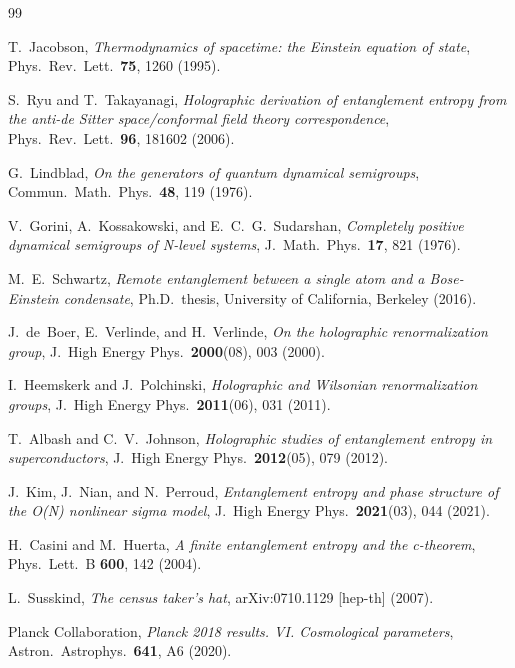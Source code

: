 \documentclass[12pt,a4paper]{article}
\theoremstyle{monette}
\theoremstyle{definition}
\begin{document}
\begin{thebibliography}{99}

T.~Jacobson,
\textit{Thermodynamics of spacetime: the Einstein equation of state},
Phys.\ Rev.\ Lett.\ \textbf{75}, 1260 (1995).

S.~Ryu and T.~Takayanagi,
\textit{Holographic derivation of entanglement entropy from the anti-de Sitter
space/conformal field theory correspondence},
Phys.\ Rev.\ Lett.\ \textbf{96}, 181602 (2006).

G.~Lindblad,
\textit{On the generators of quantum dynamical semigroups},
Commun.\ Math.\ Phys.\ \textbf{48}, 119 (1976).

V.~Gorini, A.~Kossakowski, and E.~C.~G.~Sudarshan,
\textit{Completely positive dynamical semigroups of N-level systems},
J.\ Math.\ Phys.\ \textbf{17}, 821 (1976).

M.~E.~Schwartz,
\textit{Remote entanglement between a single atom and a Bose-Einstein condensate},
Ph.D.\ thesis, University of California, Berkeley (2016).

J.~de~Boer, E.~Verlinde, and H.~Verlinde,
\textit{On the holographic renormalization group},
J.\ High Energy Phys.\ \textbf{2000}(08), 003 (2000).

I.~Heemskerk and J.~Polchinski,
\textit{Holographic and Wilsonian renormalization groups},
J.\ High Energy Phys.\ \textbf{2011}(06), 031 (2011).

T.~Albash and C.~V.~Johnson,
\textit{Holographic studies of entanglement entropy in superconductors},
J.\ High Energy Phys.\ \textbf{2012}(05), 079 (2012).

J.~Kim, J.~Nian, and N.~Perroud,
\textit{Entanglement entropy and phase structure of the O(N) nonlinear sigma model},
J.\ High Energy Phys.\ \textbf{2021}(03), 044 (2021).

H.~Casini and M.~Huerta,
\textit{A finite entanglement entropy and the c-theorem},
Phys.\ Lett.\ B \textbf{600}, 142 (2004).

L.~Susskind,
\textit{The census taker's hat},
arXiv:0710.1129 [hep-th] (2007).

Planck Collaboration,
\textit{Planck 2018 results. VI. Cosmological parameters},
Astron.\ Astrophys.\ \textbf{641}, A6 (2020).


\end{thebibliography}
\end{document}
